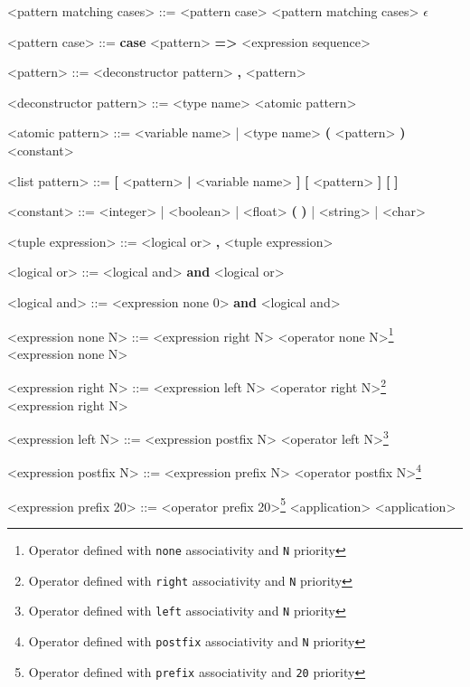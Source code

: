 \documentclass[12pt]{article}
\begin{document}
\begin{grammar}
<pattern matching cases> ::= <pattern case> <pattern matching cases>
    \alt $\epsilon$

<pattern case> ::= \textbf{case} <pattern> \textbf{=>} <expression sequence>

<pattern> ::= <deconstructor pattern>
     \textbf{,} <pattern>

<deconstructor pattern> ::= <type name> <atomic pattern>

<atomic pattern> ::= <variable name> | <type name>
    \alt \textbf{(} <pattern> \textbf{)}
    \alt <constant>

<list pattern> ::= \textbf{[} <pattern> \textbf{|} <variable name> \textbf{]}
    \alt \textbf{[} <pattern> \textbf{]}
    \alt \textbf{[\,\,]}

<constant> ::= <integer> | <boolean> | <float> 
    \alt \textbf{(\,\,)} | <string> | <char>

<tuple expression> ::= <logical or> \textbf{,} <tuple expression>

<logical or> ::= <logical and> \textbf{and} <logical or>

<logical and> ::= <expression none 0> \textbf {and} <logical and>

<expression none N> ::= <expression right N> <operator none N>\footnote{Operator defined with \texttt{none} associativity and \texttt{N} priority}\\ <expression none N>

<expression right N> ::= <expression left N> <operator right N>\footnote{Operator defined with \texttt{right} associativity and \texttt{N} priority}\\ <expression right N>

<expression left N> ::= <expression postfix N> <operator left N>\footnote{Operator defined with \texttt{left} associativity and \texttt{N} priority}\\<expression left N>

<expression postfix N> ::= <expression prefix N> <operator postfix N>\footnote{Operator defined with \texttt{postfix} associativity and \texttt{N} priority}

<expression prefix 20> ::= <operator prefix 20>\footnote{Operator defined with \texttt{prefix} associativity and \texttt{20} priority} <application>
    \alt <application>


\end{grammar}
\end{document}
